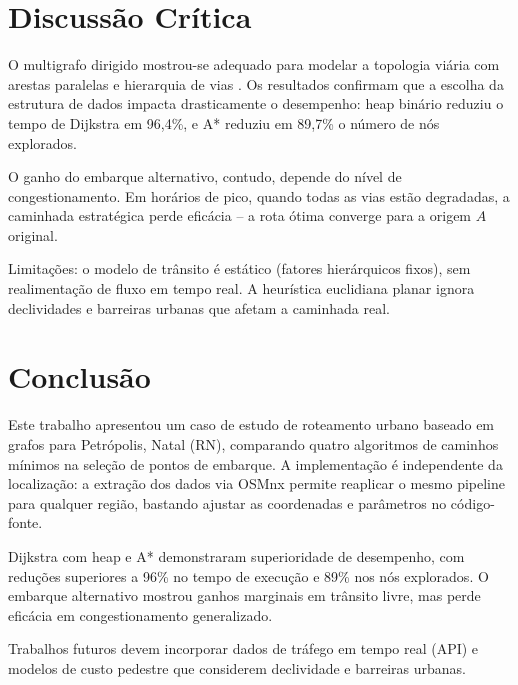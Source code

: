\documentclass[conference]{IEEEtran}
\begin{document}
\section{Discussão Crítica}

O multigrafo dirigido mostrou-se adequado para modelar a topologia viária com arestas paralelas e hierarquia de vias \cite{osmnx}. Os resultados confirmam que a escolha da estrutura de dados impacta drasticamente o desempenho: heap binário reduziu o tempo de Dijkstra em 96,4\%, e A* reduziu em 89,7\% o número de nós explorados.

O ganho do embarque alternativo, contudo, depende do nível de congestionamento. Em horários de pico, quando todas as vias estão degradadas, a caminhada estratégica perde eficácia -- a rota ótima converge para a origem $A$ original.

Limitações: o modelo de trânsito é estático (fatores hierárquicos fixos), sem realimentação de fluxo em tempo real. A heurística euclidiana planar ignora declividades e barreiras urbanas que afetam a caminhada real.

\section{Conclusão}

Este trabalho apresentou um caso de estudo de roteamento urbano baseado em grafos para Petrópolis, Natal (RN), comparando quatro algoritmos de caminhos mínimos na seleção de pontos de embarque. A implementação é independente da localização: a extração dos dados via OSMnx permite reaplicar o mesmo pipeline para qualquer região, bastando ajustar as coordenadas e parâmetros no código-fonte.

Dijkstra com heap e A* demonstraram superioridade de desempenho, com reduções superiores a 96\% no tempo de execução e 89\% nos nós explorados. O embarque alternativo mostrou ganhos marginais em trânsito livre, mas perde eficácia em congestionamento generalizado.

Trabalhos futuros devem incorporar dados de tráfego em tempo real (API) e modelos de custo pedestre que considerem declividade e barreiras urbanas.


\end{document}

